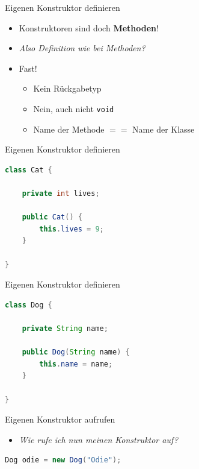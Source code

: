 \documentclass[18pt]{beamer}
\begin{document}
\begin{frame}{Eigenen Konstruktor definieren}
    \begin{itemize}
        \item Konstruktoren sind doch \textbf{Methoden}!
        \pause
        \item \textit{Also Definition wie bei Methoden?}
        \pause
        \item Fast!
        \begin{itemize}
            \item Kein Rückgabetyp
            \item Nein, auch nicht \texttt{void}
            \item Name der Methode $==$ Name der Klasse
        \end{itemize}
    \end{itemize}
\end{frame}

\begin{frame}[fragile]{Eigenen Konstruktor definieren}
    \begin{exampleblock}{}
        \begin{lstlisting}[language=Java]
class Cat {

    private int lives;

    public Cat() {
        this.lives = 9;
    }

}
        \end{lstlisting}
    \end{exampleblock}
\end{frame}

\begin{frame}[fragile]{Eigenen Konstruktor definieren}
    \begin{exampleblock}{}
        \begin{lstlisting}[language=Java]
class Dog {

    private String name;

    public Dog(String name) {
        this.name = name;
    }

}
        \end{lstlisting}
    \end{exampleblock}
\end{frame}

\begin{frame}[fragile]{Eigenen Konstruktor aufrufen}
    \begin{itemize}
        \item \textit{Wie rufe ich nun meinen Konstruktor auf?}
    \end{itemize}

    \vspace{.2in}
    \begin{exampleblock}{}
        \begin{lstlisting}[language=Java,basicstyle=\huge]
Dog odie = new Dog("Odie");
        \end{lstlisting}
    \end{exampleblock}
\end{frame}
\end{document}
